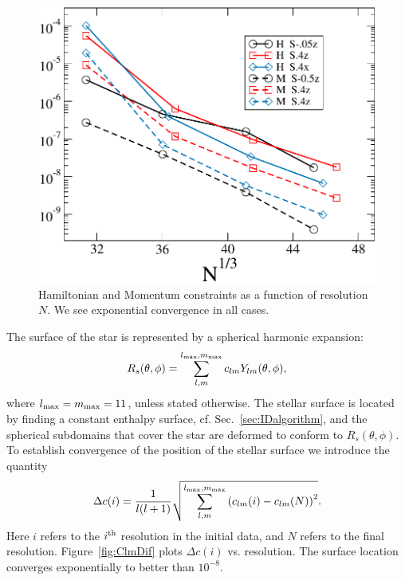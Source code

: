 {\begin{figure}
\includegraphics[width=0.95\columnwidth]{chap2/HamMom}
\caption[Convergence of the Hamiltonian and Momentum constraints.]{{\label{fig:HamMom}}Hamiltonian and Momentum constraints as a function of resolution $N$. We see exponential
  convergence in all cases.}
\end{figure}

 The surface of the star is represented by a spherical harmonic expansion:
\begin{equation}
R_s(\theta,\phi) = \sum^{l_{\rm max},m_{\rm
    max}}_{l,m}c_{lm}Y_{lm}(\theta,\phi),
\end{equation}
where $l_{\rm max}= m_{\rm max} = 11$, unless stated otherwise.
The stellar surface is located by finding a constant enthalpy surface, cf. Sec.~\ref{sec:IDalgorithm}, and the spherical subdomains that cover the star are deformed to conform to $R_s(\theta,\phi)$.
To establish convergence of the position of the stellar surface we
introduce the quantity
\begin{equation}
\label{eq:Deltac}
\Delta c(i) = \frac{1}{l(l+1)} \sqrt{\sum^{l_{\rm max},m_{\rm
      max}}_{l,m}\left(c_{lm}(i)-c_{lm}(N)\right)^2}.
\end{equation}
Here $i$ refers to the $i^{\rm th}$ resolution in the initial data,
and $N$ refers to the final resolution. Figure~\ref{fig:ClmDif} plots $\Delta c(i)$ vs. resolution.  The surface location converges exponentially to better than $10^{-8}$.

}
